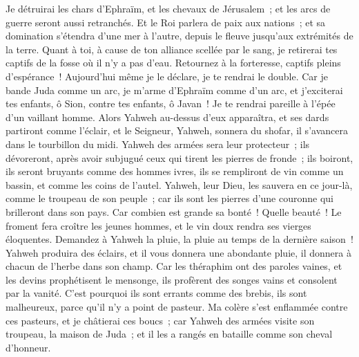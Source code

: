 \begin{multicols}{2}
Je détruirai les chars d'Ephraïm, et les chevaux de Jérusalem~; et les arcs de guerre seront aussi retranchés. Et le Roi parlera de paix aux nations~; et sa domination s'étendra d'une mer à l'autre, depuis le fleuve jusqu'aux extrémités de la terre.
Quant à toi, à cause de ton alliance scellée par le sang, je retirerai tes captifs de la fosse où il n'y a pas d'eau.
Retournez à la forteresse, captifs pleins d'espérance~! Aujourd'hui même je le déclare, je te rendrai le double.
Car je bande Juda comme un arc, je m'arme d'Ephraïm comme d'un arc, et j'exciterai tes enfants, ô Sion, contre tes enfants, ô Javan~! Je te rendrai pareille à l'épée d'un vaillant homme.
Alors Yahweh au-dessus d'eux apparaîtra, et ses dards partiront comme l'éclair, et le Seigneur, Yahweh, sonnera du shofar, il s'avancera dans le tourbillon du midi.
Yahweh des armées sera leur protecteur~; ils dévoreront, après avoir subjugué ceux qui tirent les pierres de fronde~; ils boiront, ils seront bruyants comme des hommes ivres, ils se rempliront de vin comme un bassin, et comme les coins de l'autel.
Yahweh, leur Dieu, les sauvera en ce jour-là, comme le troupeau de son peuple~; car ils sont les pierres d'une couronne qui brilleront dans son pays.
Car combien est grande sa bonté~! Quelle beauté~! Le froment fera croître les jeunes hommes, et le vin doux rendra ses vierges éloquentes.
\VerseOne{}Demandez à Yahweh la pluie, la pluie au temps de la dernière saison~! Yahweh produira des éclairs, et il vous donnera une abondante pluie, il donnera à chacun de l'herbe dans son champ.
Car les théraphim ont des paroles vaines, et les devins prophétisent le mensonge, ils profèrent des songes vains et consolent par la vanité. C'est pourquoi ils sont errants comme des brebis, ils sont malheureux, parce qu'il n'y a point de pasteur.
Ma colère s'est enflammée contre ces pasteurs, et je châtierai ces boucs~; car Yahweh des armées visite son troupeau, la maison de Juda~; et il les a rangés en bataille comme son cheval d'honneur.

\end{multicols}
